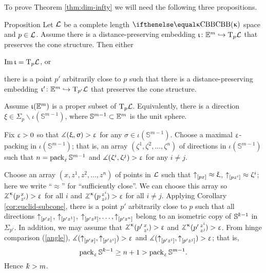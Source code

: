To prove Theorem \ref{thm:dim-infty}  we will need the following three propositions.


\begin{thm}{Proposition}\label{E=T}
Let $\mathcal{L}$ be a complete length $\Alex{\kappa}$ space and $p\in \spc{L}$.
Assume there is a distance-preserving 
embedding $\iota\:\EE^{m}\hookrightarrow \T_p\spc{L}$ 
that preserves the cone structure.
Then either
\begin{subthm}{}
 $\mathop{\rm Im}\nolimits\upiota=\text{\rm T}_p\mathcal{L}$, or
\end{subthm}

\begin{subthm}{} there is a point $p'$ arbitrarily close to $p$ such that there is a distance-preserving embedding $\iota'\:\EE^{m}\hookrightarrow \T_{p'}\spc{L}$ 
that preserves the cone structure.
\end{subthm}
\end{thm}


Assume $\upiota(\mathbb{E}^{m})$ is a proper subset of $\text{\rm T}_p\mathcal{L}$.
Equivalently, there is a direction $\xi \in \Sigma_p\backslash\iota(\mathbb{S}^{m-1})$,
where $\mathbb{S}^{m-1}\subset \EE^m$ is the unit sphere. 

Fix $\upvarepsilon>0$ so that $\measuredangle(\upxi,\upsigma)>\upvarepsilon$ for any $\sigma\in \iota(\mathbb{S}^{m-1})$. 
Choose a maximal $\upvarepsilon$-packing in $\iota(\mathbb{S}^{m-1})$;
that is, an array  $(\zeta^1,\zeta^2,\dots,\zeta^n)$ of directions in $\iota(\mathbb{S}^{m-1})$ such that $n=\mathop{\rm pack}\nolimits_\upvarepsilon \mathbb{S}^{m-1}$ and $\measuredangle(\upzeta^i,\upzeta^j)>\upvarepsilon$ for any $i\not=j$.

Choose an array $(x,z^1,z^2,\dots,z^n)$  of points in $\mathcal{L}$ such that
$\dir p x\approx\xi$, $\dir p{z^i}\approx\zeta^i$; 
here we write ``$\approx$'' for ``sufficiently close''.
We can choose this array so 
$\angk{\kappa}p x{z^i}>\eps$ for all $i$ 
and $\angk{\kappa}p{z^i}{z^j}>\eps$ for all $i\not=j$.
Applying Corollary \ref{cor:euclid-subcone}, there is a point $p'$ arbitrarily close to  $p$ 
such that all directions ${\uparrow}_{[{p'}{x}]}$, ${\uparrow}_{[{p'}{z^1}]}$, $\dir{p'}{z^2},\dots,\dir{p'}{z^n}$
belong to an isometric copy of $\mathbb{S}^{\kay-1}$ in $\Sigma_{p'}$.
In addition, we may assume that $\angk{\kappa}{p'}x{z^i}>\eps$ and $\angk{\kappa}{p'}{z^i}{z^j}>\eps$.
From hinge comparison (\ref{angle}),
$\measuredangle({\uparrow}_{[{p'}{x}]},{\uparrow}_{[{p'}{z^i}]})>\upvarepsilon$ 
and $\measuredangle({\uparrow}_{[{p'}{z^i}]},{\uparrow}_{[{p'}{z^j}]})>\upvarepsilon$;
that is, 
\[\pack_\eps \mathbb{S}^{\kay-1}\ge n+1>\pack_\eps \mathbb{S}^{m-1}.\] 
Hence $\kay>m$.
\qeds


